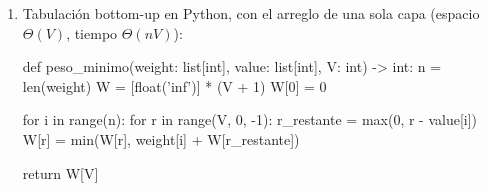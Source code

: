 \begin{enumerate}
\begin{center}

Dependencias de la capa $i$ hacia la capa $i-1$, para $\text{value}[i]=2$ y $V=3$: cada $(i,r)$ depende de $(i-1,r)$ (no tomar el elemento) y de $(i-1,\max(0,r-\text{value}[i]))$ (tomarlo). Nótese que $r=1$ y $r=2$ ambos apuntan a $(i-1,0)$ al tomarlo, porque el valor sobrante se capa en $0$.
\end{center}

  Como cada capa solo depende de la inmediatamente anterior, no hace falta conservar la tabla completa: basta un arreglo de tamaño $V+1$ actualizado capa por capa, siempre que $r$ se recorra en orden \emph{decreciente} dentro de cada capa (así $W(i-1,\max(0,r-\text{value}[i]))$ no ha sido sobreescrito todavía cuando se necesita, pues $\max(0,r-\text{value}[i]) \le r$). Esto reduce el espacio a $\Theta(V)$, sin cambiar el tiempo: cada uno de los $\Theta(nV)$ estados se resuelve con trabajo $\Theta(1)$, así que la complejidad temporal es $\Theta(nV)$.

  \pagebreak

  \item Tabulación bottom-up en Python, con el arreglo de una sola capa (espacio $\Theta(V)$, tiempo $\Theta(nV)$):

\begin{pseudocode}
def peso_minimo(weight: list[int], value: list[int], V: int) -> int:
    n = len(weight)
    W = [float('inf')] * (V + 1)
    W[0] = 0

    for i in range(n):
        for r in range(V, 0, -1):
            r_restante = max(0, r - value[i])
            W[r] = min(W[r], weight[i] + W[r_restante])

    return W[V]
\end{pseudocode}
\end{enumerate}

